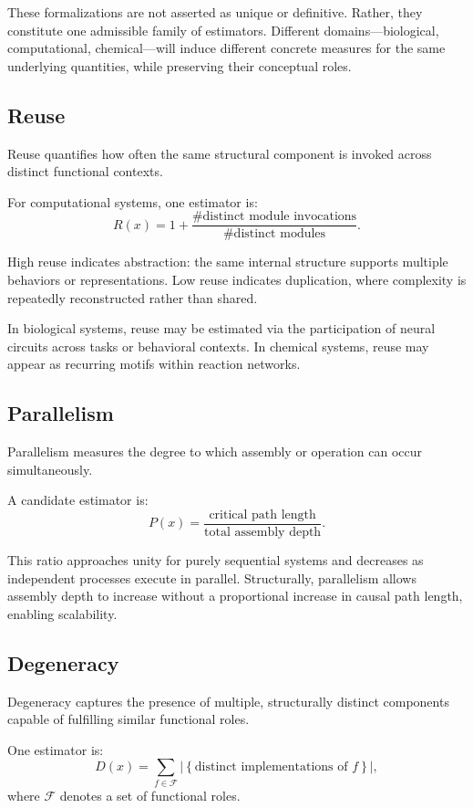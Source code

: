 \documentclass[11pt,letterpaper]{article}
\begin{document}
These formalizations are not asserted as unique or definitive. Rather, they constitute one admissible family of estimators. Different domains—biological, computational, chemical—will induce different concrete measures for the same underlying quantities, while preserving their conceptual roles.

\subsection{Reuse}

Reuse quantifies how often the same structural component is invoked across distinct functional contexts.

For computational systems, one estimator is:
\[
R(x) = 1 + \frac{\#\text{distinct module invocations}}{\#\text{distinct modules}}.
\]

High reuse indicates abstraction: the same internal structure supports multiple behaviors or representations. Low reuse indicates duplication, where complexity is repeatedly reconstructed rather than shared.

In biological systems, reuse may be estimated via the participation of neural circuits across tasks or behavioral contexts. In chemical systems, reuse may appear as recurring motifs within reaction networks.

\subsection{Parallelism}

Parallelism measures the degree to which assembly or operation can occur simultaneously.

A candidate estimator is:
\[
P(x) = \frac{\text{critical path length}}{\text{total assembly depth}}.
\]

This ratio approaches unity for purely sequential systems and decreases as independent processes execute in parallel. Structurally, parallelism allows assembly depth to increase without a proportional increase in causal path length, enabling scalability.

\subsection{Degeneracy}

Degeneracy captures the presence of multiple, structurally distinct components capable of fulfilling similar functional roles.

One estimator is:
\[
D(x) = \sum_{f \in \mathcal{F}} \left| \left\{ \text{distinct implementations of } f \right\} \right|,
\]
where $\mathcal{F}$ denotes a set of functional roles.
\end{document}
